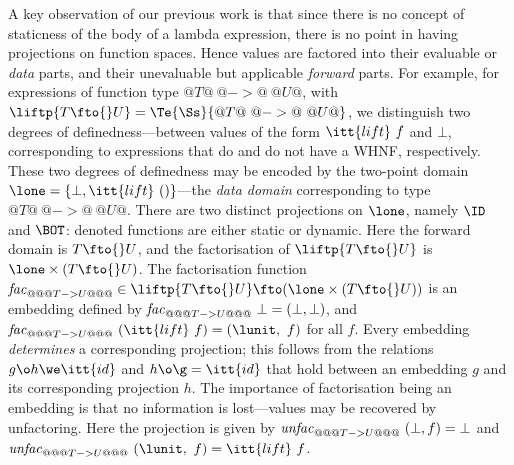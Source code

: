 \documentclass[11pt]{article}
\begin{document}
A key observation of our previous work
\cite{Dav93b} is that since there is no concept
of staticness of the body of a lambda expression, there is no point in
having projections on function spaces.  Hence values are factored into
their evaluable or {\it data\/} parts, and their unevaluable but
applicable {\it forward\/} parts.  For example, for expressions of
function type ${@T@\ @->@\ @U@}$, with
$\liftp{T\fto{}U}=\Te{\Ss}{@T@\ @->@\ @U@}$, we distinguish two
degrees of definedness---between values of the form
$\itt{lift}~f$ and $\bot$, corresponding to expressions that do and
do not have a WHNF, respectively.  These two degrees of definedness 
may be encoded by the two-point
domain $\lone=\{\bot, \itt{lift}~()\}$---the {\it data domain\/} corresponding
to type ${@T@\ @->@\ @U@}$.  There are two distinct projections on $\lone$,
namely $\ID$ and $\BOT$: denoted functions are 
either static or dynamic.  Here 
the forward domain is $T\fto{}U$, and the factorisation of $\liftp{T\fto{}U}$
is $\lone\times(T\fto{}U)$.  The factorisation function
${\it{}fac}_{@@@T->U@@@}\in\liftp{T\fto{}U}\fto(\lone\times(T\fto{}U))$
is an embedding defined by
${\it{}fac}_{@@@T->U@@@}~\bot=(\bot,\bot)$, and
${\it{}fac}_{@@@T->U@@@}~(\itt{lift}~f)=(\lunit,~f)$ for all $f$.
Every embedding {\it determines\/} a corresponding projection; 
this follows from the relations $g\o h\we\itt{id}$ and $h\o\g=\itt{id}$
that hold between an embedding $g$ and its corresponding projection $h$.
The importance of factorisation being an embedding is that no information
is lost---values may be recovered by unfactoring.  Here the
projection is given by
${\it{}unfac}_{@@@T->U@@@}~(\bot,f)=\bot$ and
${\it{}unfac}_{@@@T->U@@@}~(\lunit,~f)=\itt{lift}~f$.
\end{document}
